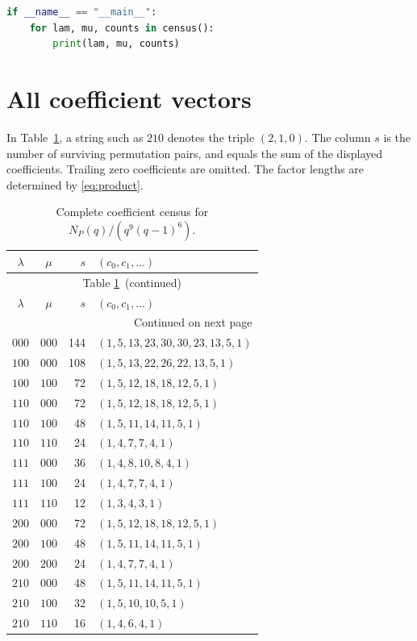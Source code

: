 \documentclass[11pt]{article}
\begin{document}
\begin{lstlisting}[language=Python,basicstyle=\ttfamily\footnotesize,columns=fullflexible,keepspaces=true,showstringspaces=false,frame=single,breaklines=true,tabsize=4]
if __name__ == "__main__":
    for lam, mu, counts in census():
        print(lam, mu, counts)
\end{lstlisting}

\clearpage
\section{All coefficient vectors}
In Table~\ref{tab:census}, a string such as $210$ denotes the triple
$(2,1,0)$. The column $s$ is the number of surviving permutation pairs,
and equals the sum of the displayed coefficients. Trailing zero
coefficients are omitted. The factor lengths are determined by
\eqref{eq:product}.
{
\small

\begin{longtable}{@{}ccrl@{}}
\caption{Complete coefficient census for $N_P(q)/(q^9(q-1)^6)$.}\label{tab:census}\\
\toprule
$\lambda$ & $\mu$ & $s$ & $(c_0,c_1,\ldots)$ \\
\midrule
\endfirsthead
\multicolumn{4}{c}{Table \ref{tab:census}\ (continued)}\\
\toprule
$\lambda$ & $\mu$ & $s$ & $(c_0,c_1,\ldots)$ \\
\midrule
\endhead
\midrule
\multicolumn{4}{r}{Continued on next page}\\
\endfoot
\bottomrule
\endlastfoot
$000$ & $000$ & 144 & $(1,5,13,23,30,30,23,13,5,1)$ \\
$100$ & $000$ & 108 & $(1,5,13,22,26,22,13,5,1)$ \\
$100$ & $100$ & 72 & $(1,5,12,18,18,12,5,1)$ \\
$110$ & $000$ & 72 & $(1,5,12,18,18,12,5,1)$ \\
$110$ & $100$ & 48 & $(1,5,11,14,11,5,1)$ \\
$110$ & $110$ & 24 & $(1,4,7,7,4,1)$ \\
$111$ & $000$ & 36 & $(1,4,8,10,8,4,1)$ \\
$111$ & $100$ & 24 & $(1,4,7,7,4,1)$ \\
$111$ & $110$ & 12 & $(1,3,4,3,1)$ \\
$200$ & $000$ & 72 & $(1,5,12,18,18,12,5,1)$ \\
$200$ & $100$ & 48 & $(1,5,11,14,11,5,1)$ \\
$200$ & $200$ & 24 & $(1,4,7,7,4,1)$ \\
$210$ & $000$ & 48 & $(1,5,11,14,11,5,1)$ \\
$210$ & $100$ & 32 & $(1,5,10,10,5,1)$ \\
$210$ & $110$ & 16 & $(1,4,6,4,1)$ \\

\end{longtable}}
\end{document}
